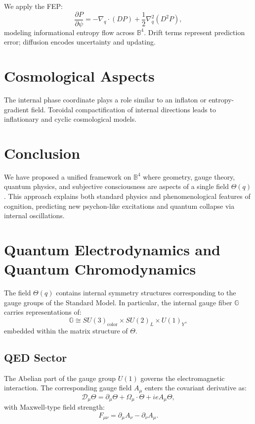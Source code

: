 \documentclass[12pt]{article}
\begin{document}
We apply the FEP:
\[
\frac{\partial P}{\partial \psi} = -\nabla_q \cdot (D P) + \frac{1}{2} \nabla_q^2 (D^2 P),
\]
modeling informational entropy flow across \( \mathbb{B}^4 \). Drift terms represent prediction error; diffusion encodes uncertainty and updating.

\section{Cosmological Aspects}

The internal phase coordinate plays a role similar to an inflaton or entropy-gradient field. Toroidal compactification of internal directions leads to inflationary and cyclic cosmological models.

\section{Conclusion}

We have proposed a unified framework on \( \mathbb{B}^4 \) where geometry, gauge theory, quantum physics, and subjective consciousness are aspects of a single field \( \Theta(q) \). This approach explains both standard physics and phenomenological features of cognition, predicting new psychon-like excitations and quantum collapse via internal oscillations.


\section{Quantum Electrodynamics and Quantum Chromodynamics}

The field \( \Theta(q) \) contains internal symmetry structures corresponding to the gauge groups of the Standard Model. In particular, the internal gauge fiber \( \mathbb{G} \) carries representations of:
\[
\mathbb{G} \cong SU(3)_\text{color} \times SU(2)_L \times U(1)_Y,
\]
embedded within the matrix structure of \( \Theta \).

\subsection{QED Sector}

The Abelian part of the gauge group \( U(1) \) governs the electromagnetic interaction. The corresponding gauge field \( A_\mu \) enters the covariant derivative as:
\[
\mathcal{D}_\mu \Theta = \partial_\mu \Theta + \Omega_\mu \cdot \Theta + i e A_\mu \Theta,
\]
with Maxwell-type field strength:
\[
F_{\mu\nu} = \partial_\mu A_\nu - \partial_\nu A_\mu.
\]
\end{document}

